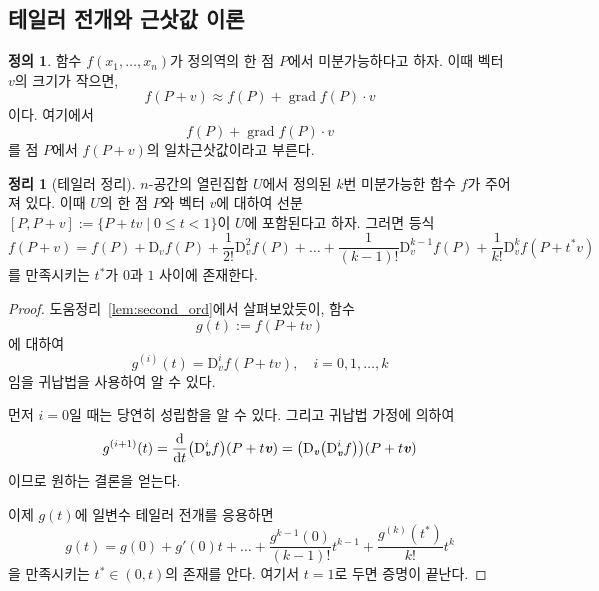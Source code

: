 \documentclass[unfonts,oneside,a4paper]{oblivoir}
\theoremstyle{definition}
\newtheorem{definition}{정의}[subsubsection]
\theoremstyle{theorem}
\newtheorem{theorem}{정리}[subsubsection]
\renewcommand{\vec}[1]{\bm{\mathit{#1}}}
\newcommand{\dD}{\mathrm{D}}
\DeclareMathOperator{\grad}{grad}
\begin{document}
\subsection{테일러 전개와 근삿값 이론}

\begin{definition}
    함수 $f(x_1, \dots, x_n)$가 정의역의 한 점 $P$에서 미분가능하다고 하자.
    이때 벡터 $\vec v$의 크기가 작으면,
    \begin{equation*}
        f(P + \vec v) \approx f(P) + \grad f(P) \cdot \vec v
    \end{equation*}
    이다.
    여기에서
    \begin{equation*}
        f(P) + \grad f(P) \cdot \vec v
    \end{equation*}
    를 점 $P$에서 $f(P + \vec v)$의 일차근삿값이라고 부른다.
\end{definition}

\begin{theorem}[테일러 정리] \label{thm:taylor}
    $n$-공간의 열린집합 $U$에서 정의된 $k$번 미분가능한 함수 $f$가 주어져 있다.
    이때 $U$의 한 점 $P$와 벡터 $\vec v$에 대하여 선분 $[P, P + \vec v] := \{P + t \vec v \mid 0 \leq t < 1\}$이 $U$에 포함된다고 하자.
    그러면 등식
    \begin{equation*}
        f(P + \vec v) = f(P) + \dD_{\vec v} f(P) + \frac{1}{2!} \dD_{\vec v}^2 f(P) + \dots + \frac{1}{(k - 1)!} \dD_{\vec v}^{k - 1} f(P) + \frac{1}{k!} \dD_{\vec v}^k f(P + t^* \vec v)
    \end{equation*}
    를 만족시키는 $t^*$가 $0$과 $1$ 사이에 존재한다.
\end{theorem}

\begin{proof}
    도움정리~\ref{lem:second_ord}에서 살펴보았듯이, 함수
    \begin{equation*}
        g(t) := f(P + t \vec v)
    \end{equation*}
    에 대하여
    \begin{equation*}
        g^{(i)}(t) = \dD_{\vec v}^i f(P + t \vec v), \quad i = 0, 1, \dots, k
    \end{equation*}
    임을 귀납법을 사용하여 알 수 있다.

    먼저 $i = 0$일 때는 당연히 성립함을 알 수 있다.
    그리고 귀납법 가정에 의하여
    \begin{equation*}
        g^{(i + 1)}(t) = \diff*{\bigl(\dD_{\vec v}^i f\bigr)}{t} (P + t \vec v) = \bigl(\dD_{\vec v} \bigl(\dD_{\vec v}^i f\bigr)\bigr)(P + t \vec v)
    \end{equation*}
    이므로 원하는 결론을 얻는다.

    이제 $g(t)$에 일변수 테일러 전개를 응용하면
    \begin{equation*}
        g(t) = g(0) + g'(0) t + \dots + \frac{g^{k - 1}(0)}{(k - 1)!} t^{k - 1} + \frac{g^{(k)}(t^*)}{k!} t^k
    \end{equation*}
    을 만족시키는 $t^* \in (0, t)$의 존재를 안다.
    여기서 $t = 1$로 두면 증명이 끝난다.
\end{proof}
\end{document}
